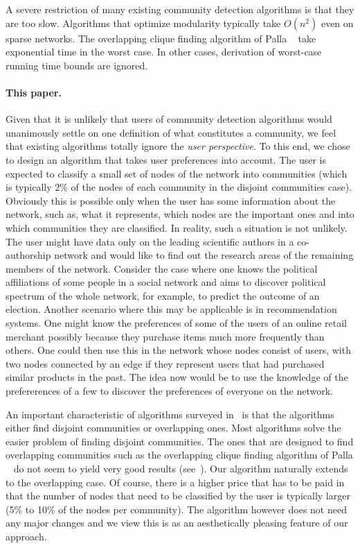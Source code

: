 A severe restriction of many existing community detection algorithms 
is that they are too slow. Algorithms that optimize modularity typically 
take $O(n^2)$ even on sparse networks. The overlapping clique finding 
algorithm of Palla \etal~\cite{PDFV05} take exponential time in the worst case.
In other cases, derivation of worst-case running time bounds are ignored. 

\paragraph{This paper.}
Given that it is unlikely that users of community detection algorithms 
would unanimously settle on one definition of what constitutes a community, 
we feel that existing algorithms totally ignore the \emph{user perspective}. To this 
end, we chose to design an algorithm that takes user preferences into 
account. The user is expected to classify a small set of nodes of the network 
into communities (which is typically 2\% of the nodes of each community in 
the disjoint communities case). Obviously this is possible only when the user has some 
information about the network, such as, what it represents, which nodes 
are the important ones and into which communities they are classified. 
In reality, such a situation is not unlikely. The user 
might have data only on the leading scientific authors in a co-authorship network 
and would like to find out the research areas of the remaining members of the network. 
Consider the case where one knows the political affiliations of some people in 
a social network and aims to discover political spectrum of the whole network, 
for example, to predict the outcome of an election. Another scenario where 
this may be applicable is in recommendation systems. One might know the 
preferences of some of the users of an online retail merchant possibly because
they purchase items much more frequently than others. One could then use this 
in the network whose nodes consist of users, with two nodes connected by an 
edge if they represent users that had purchased similar products in the past. 
The idea now would be to use the knowledge of the prefererences of a few to 
discover the preferences of everyone on the network. 


An important characteristic of algorithms surveyed in~\cite{LF09} 
is that the algorithms either find disjoint communities or overlapping 
ones. Most algorithms solve the easier problem of finding disjoint communities. 
The ones that are designed to find overlapping communities such as the overlapping clique finding 
algorithm of Palla \etal~\cite{PDFV05} do not seem to yield very good results (see~\cite{LF09}).
Our algorithm naturally extends to the overlapping case. Of course, there is a higher 
price that has to be paid in that the number of nodes that need to be classified by the user 
is typically larger (5\% to 10\% of the nodes per community). The algorithm however 
does not need any major changes and we view this is as an aesthetically pleasing 
feature of our approach. 

